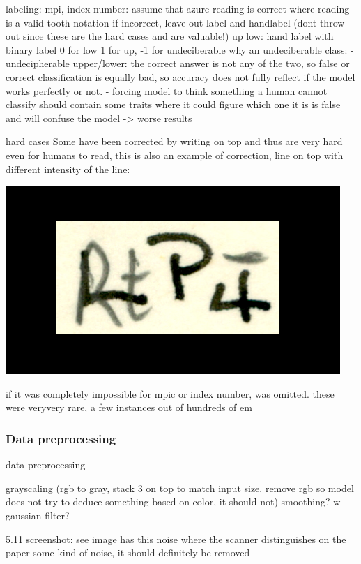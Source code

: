 \documentclass{article}
\begin{document}
labeling:
mpi, index number: assume that azure reading is correct where reading is a valid tooth notation
if incorrect, leave out label and handlabel (dont throw out since these are the hard cases and are valuable!)
up low: hand label with binary label 0 for low 1 for up, -1 for undeciberable
    why an undeciberable class:
    - undecipherable upper/lower: the correct answer is not any of the two, so false or correct classification is equally bad, so accuracy does not fully reflect if the model works perfectly or not.
    - forcing model to think something a human cannot classify should contain some traits where it could figure which one it is is false and will confuse the model -> worse results

hard cases
Some have been corrected by writing on top and thus are very hard 
even for humans to read, this is also an example of correction, line on top with different
intensity of the line: 

\includegraphics*[scale=0.2]{../images/superambiguous_data_sample.png}

if it was completely impossible for mpic or index number, was omitted. these were veryvery rare, a few instances out of hundreds of em

\subsubsection{Data preprocessing}

data preprocessing

grayscaling (rgb to gray, stack 3 on top to match input size. remove rgb so model does not try to deduce something based on color, it should not)
smoothing? w gaussian filter?

5.11 screenshot: see image has this noise where the scanner distinguishes on the paper some kind of noise, it should definitely be removed
\end{document}
